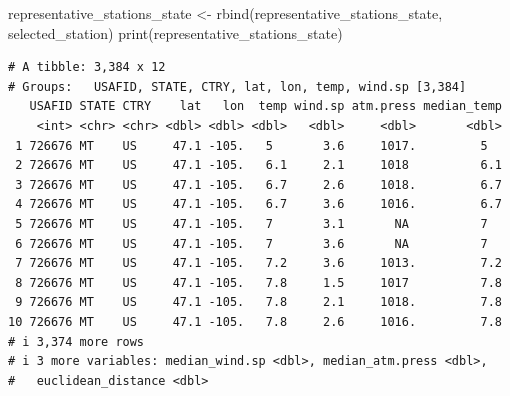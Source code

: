 \documentclass[
  letterpaper,
  DIV=11,
  numbers=noendperiod]{scrartcl}
\newenvironment{Shaded}{\begin{snugshade}}{\end{snugshade}}
\newcommand{\CommentTok}[1]{\textcolor[rgb]{0.37,0.37,0.37}{#1}}
\newcommand{\ControlFlowTok}[1]{\textcolor[rgb]{0.00,0.23,0.31}{\textbf{#1}}}
\newcommand{\DecValTok}[1]{\textcolor[rgb]{0.68,0.00,0.00}{#1}}
\newcommand{\FunctionTok}[1]{\textcolor[rgb]{0.28,0.35,0.67}{#1}}
\newcommand{\NormalTok}[1]{\textcolor[rgb]{0.00,0.23,0.31}{#1}}
\newcommand{\OtherTok}[1]{\textcolor[rgb]{0.00,0.23,0.31}{#1}}
\newcommand{\SpecialCharTok}[1]{\textcolor[rgb]{0.37,0.37,0.37}{#1}}
\begin{document}
\begin{Shaded}
\end{Shaded}

\begin{Shaded}
\begin{Highlighting}[]
\NormalTok{representative\_stations\_state }\OtherTok{\textless{}{-}} \FunctionTok{rbind}\NormalTok{(representative\_stations\_state, selected\_station)}
\FunctionTok{print}\NormalTok{(representative\_stations\_state)}
\end{Highlighting}
\end{Shaded}

\begin{verbatim}
# A tibble: 3,384 x 12
# Groups:   USAFID, STATE, CTRY, lat, lon, temp, wind.sp [3,384]
   USAFID STATE CTRY    lat   lon  temp wind.sp atm.press median_temp
    <int> <chr> <chr> <dbl> <dbl> <dbl>   <dbl>     <dbl>       <dbl>
 1 726676 MT    US     47.1 -105.   5       3.6     1017.         5  
 2 726676 MT    US     47.1 -105.   6.1     2.1     1018          6.1
 3 726676 MT    US     47.1 -105.   6.7     2.6     1018.         6.7
 4 726676 MT    US     47.1 -105.   6.7     3.6     1016.         6.7
 5 726676 MT    US     47.1 -105.   7       3.1       NA          7  
 6 726676 MT    US     47.1 -105.   7       3.6       NA          7  
 7 726676 MT    US     47.1 -105.   7.2     3.6     1013.         7.2
 8 726676 MT    US     47.1 -105.   7.8     1.5     1017          7.8
 9 726676 MT    US     47.1 -105.   7.8     2.1     1018.         7.8
10 726676 MT    US     47.1 -105.   7.8     2.6     1016.         7.8
# i 3,374 more rows
# i 3 more variables: median_wind.sp <dbl>, median_atm.press <dbl>,
#   euclidean_distance <dbl>
\end{verbatim}
\end{document}

